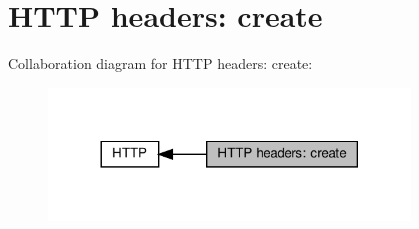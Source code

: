 \hypertarget{group__HTTP-headers-create}{}\section{H\+T\+TP headers\+: create}
\label{group__HTTP-headers-create}
Collaboration diagram for H\+T\+TP headers\+: create\+:
\nopagebreak
\begin{figure}[H]
\begin{center}
\leavevmode
\includegraphics[width=272pt]{group__HTTP-headers-create}
\end{center}
\end{figure}
